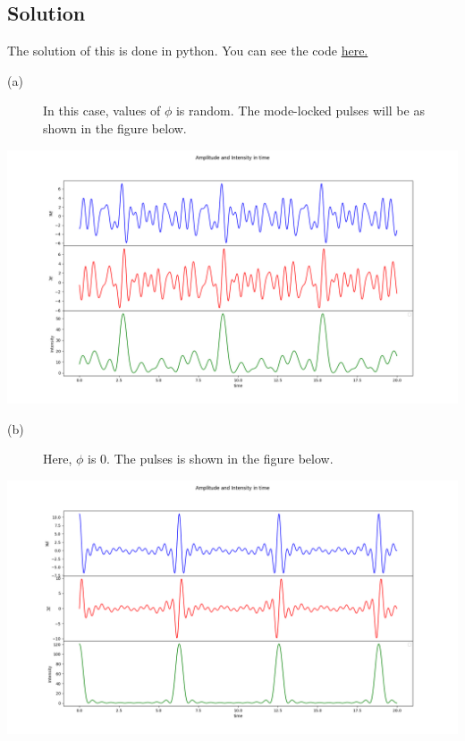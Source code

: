 \documentclass[a4paper,11pt]{article}
\begin{document}
\subsection*{Solution}
\label{sec:org18ffe39}
The solution of this is done in python. You can see the code \href{https://github.com/varghesereji/Coursework\_assignments/blob/main/CQO/Ass\_2/Problem\_7\_answer\_code.py}{here.}
\begin{description}
\item[{(a)}] In this case, values of \(\phi\) is random.  The mode-locked pulses will be as shown in the figure below.
\end{description}
\begin{center}
\includegraphics[width=.9\linewidth]{pr_7_a.png}
\end{center}
\begin{description}
\item[{(b)}] Here, \(\phi\) is 0. The pulses is shown in the figure below.
\end{description}
\begin{center}
\includegraphics[width=.9\linewidth]{pr_7_b.png}
\end{center}

\newpage
\end{document}
